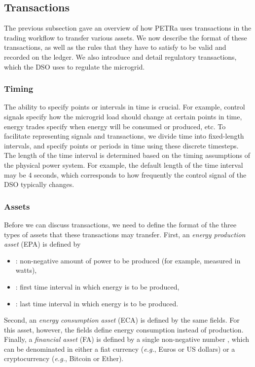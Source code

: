 \subsection{Transactions}

The previous subsection gave an overview of how PETRa uses
transactions in the trading workflow to transfer various assets.  We
now describe the format of these transactions, as well as the rules
that they have to satisfy to be valid and recorded on the ledger.  We
also introduce and detail regulatory transactions, which the DSO uses
to regulate the microgrid.

\subsubsection{Timing}
The ability to specify points or intervals in time is crucial.  For
example, control signals specify how the microgrid load should change
at certain points in time, energy trades specify when energy will be
consumed or produced, etc.  To facilitate representing signals and
transactions, we divide time into fixed-length intervals, and specify
points or periods in time using these discrete timesteps.  The length
of the time interval is determined based on the timing assumptions of
the physical power system.  For example, the default length of the
time interval may be 4 seconds, which corresponds to how frequently
the control signal of the DSO typically changes.      

\subsubsection{Assets}
Before we can discuss transactions, we need to define the format of
the three types of assets that these transactions may transfer.
First, an \emph{energy production asset} (EPA) is defined by
\begin{itemize}[noitemsep,topsep=-\parskip]
\item {}: non-negative amount of power to be produced (for example, measured in watts),
\item {}: first time interval in which energy is to be produced,
\item {}: last time interval in which energy is to be produced.
\end{itemize}
\vspace{\parskip} Second, an \emph{energy consumption asset} (ECA) is
defined by the same fields.  For this asset, however, the fields
define energy consumption instead of production.  Finally, a
\emph{financial asset} (FA) is defined by a single non-negative number
, which can be denominated in either a fiat currency
(\emph{e.g.}, Euros or US dollars) or a cryptocurrency (\emph{e.g.},
Bitcoin or Ether).

